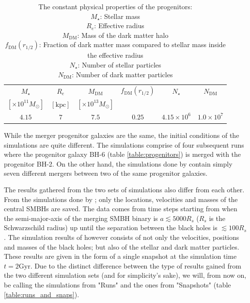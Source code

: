 \documentclass[english, oneside]{HYgradu}
\begin{document}
\begin{table}
	\begin{center}
		\begin{tabular}{c c c c c c}
		\hline
		\hline
		$M_\star$ & $R_e$ & $M_\mathrm{DM}$ & $f_\mathrm{DM}(r_{1/2})$ & $N_\star$ & $N_\mathrm{DM}$ \\
		$[\times 10^{11} M_\odot]$ & $[\mathrm{kpc}]$ & $[\times 10^{13} M_\odot]$ & & & \\
		\hline
		$4.15$ & $7$ & $7.5$ & $0.25$ & $4.15 \times 10^6$ & $1.0 \times 10^7$ \\
		\hline
		\end{tabular}
	\end{center}
	\caption{The constant physical properties of the progenitors: \\
	$M_\star$: Stellar mass \\
	$R_e$: Effective radius \\
	$M_\mathrm{DM}$: Mass of the dark matter halo \\
	$f_\mathrm{DM}(r_{1/2})$: Fraction of dark matter mass compared to stellar mass inside the effective radius \\
	$N_\star$: Number of stellar particles \\
	$N_\mathrm{DM}$: Number of dark matter particles}
	\label{table:properties}
\end{table}

While the merger progenitor galaxies are the same, the initial conditions of the simulations are quite different. The \cite{Mannerkoski2019} simulations comprise of four subsequent runs where the progenitor galaxy BH-6 (table \ref{table:progenitors}) is merged with the progenitor BH-2. On the other hand, the simulations done by \cite{Rantala2018} contain simply seven different mergers between two of the same progenitor galaxies.

The results gathered from the two sets of simulations also differ from each other. From the simulations done by \cite{Mannerkoski2019}; only the locations, velocities and masses of the central SMBHs are saved. The data comes from time steps starting from when the semi-major-axis of the merging SMBH binary is $a \lesssim 5000 R_s$ ($R_s$ is the Schwarzschild radius) up until the separation between the black holes is $\lesssim 100 R_s$. The simulation results of \cite{Rantala2018} however consists of not only the velocities, positions and masses of the black holes; but also of the stellar and dark matter particles. These results are given in the form of a single snapshot at the simulation time $t = 2 \mathrm{Gyr}$. Due to the distinct difference between the type of results gained from the two different simulation sets (and for simplicity's sake), we will, from now on, be calling the simulations from \cite{Mannerkoski2019} "Runs" and the ones from \cite{Rantala2018} "Snapshots" (table \ref{table:runs_and_snaps}).
\end{document}
